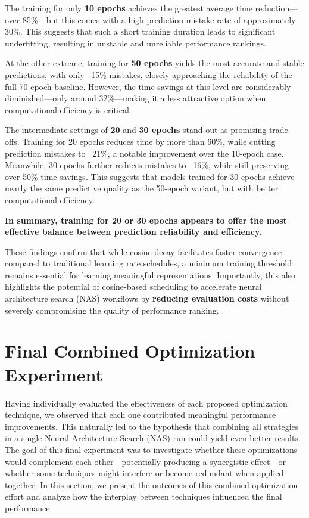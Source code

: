The training for only \textbf{10 epochs} achieves the greatest average time reduction—over 85\%—but this comes with a high prediction mistake rate of approximately 30\%. This suggests that such a short training duration leads to significant underfitting, resulting in unstable and unreliable performance rankings.

At the other extreme, training for \textbf{50 epochs} yields the most accurate and stable predictions, with only ~15\% mistakes, closely approaching the reliability of the full 70-epoch baseline. However, the time savings at this level are considerably diminished—only around 32\%—making it a less attractive option when computational efficiency is critical.

The intermediate settings of \textbf{20} and \textbf{30 epochs} stand out as promising trade-offs. Training for 20 epochs reduces time by more than 60\%, while cutting prediction mistakes to ~21\%, a notable improvement over the 10-epoch case. Meanwhile, 30 epochs further reduces mistakes to ~16\%, while still preserving over 50\% time savings. This suggests that models trained for 30 epochs achieve nearly the same predictive quality as the 50-epoch variant, but with better computational efficiency.

\textbf{In summary, training for 20 or 30 epochs appears to offer the most effective balance between prediction reliability and efficiency.}

These findings confirm that while cosine decay facilitates faster convergence compared to traditional learning rate schedules, a minimum training threshold remains essential for learning meaningful representations. Importantly, this also highlights the potential of cosine-based scheduling to accelerate neural architecture search (NAS) workflows by \textbf{reducing evaluation costs} without severely compromising the quality of performance ranking.


\section{Final Combined Optimization Experiment}

Having individually evaluated the effectiveness of each proposed optimization technique, we observed that each one contributed meaningful performance improvements. This naturally led to the hypothesis that combining all strategies in a single Neural Architecture Search (NAS) run could yield even better results. The goal of this final experiment was to investigate whether these optimizations would complement each other—potentially producing a synergistic effect—or whether some techniques might interfere or become redundant when applied together. In this section, we present the outcomes of this combined optimization effort and analyze how the interplay between techniques influenced the final performance.

